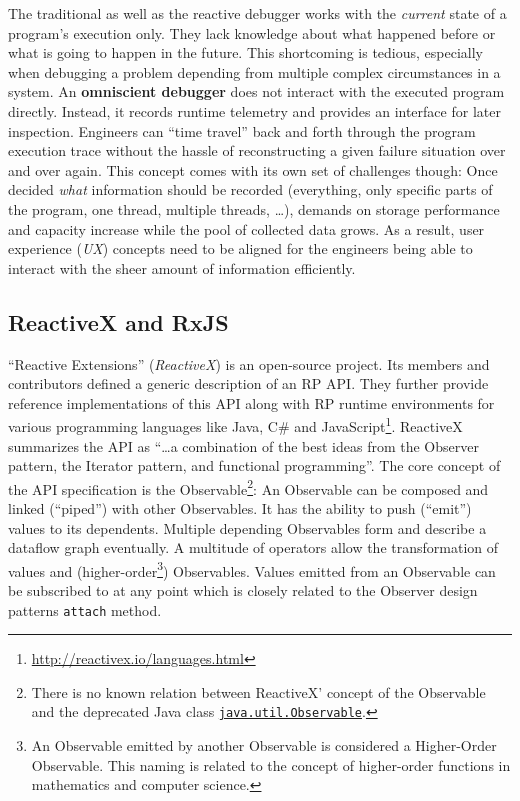 \documentclass[12pt,a4paper]{article}
\begin{document}
The traditional as well as the reactive debugger works with the \emph{current} state of a program's execution only. They lack knowledge about what happened before or what is going to happen in the future. This shortcoming is tedious, especially when debugging a problem depending from multiple complex circumstances in a system. An \textbf{omniscient debugger} \cite{5287015} \cite{DBLP:journals/corr/OCallahanJFHNP17} does not interact with the executed program directly. Instead, it records runtime telemetry and provides an interface for later inspection. Engineers can ``time travel'' back and forth through the program execution trace without the hassle of reconstructing a given failure situation over and over again. This concept comes with its own set of challenges though: Once decided \emph{what} information should be recorded (everything, only specific parts of the program, one thread, multiple threads, \dots), demands on storage performance and capacity increase while the pool of collected data grows. As a result, user experience (\emph{UX}) concepts need to be aligned for the engineers being able to interact with the sheer amount\cite{5287015} of information efficiently.

\subsection{ReactiveX and RxJS}

``Reactive Extensions'' (\emph{ReactiveX}) is an open-source project. Its members and contributors defined a generic description of an RP API. They further provide reference implementations of this API along with RP runtime environments for various programming languages like Java, C\# and JavaScript\footnote{\url{http://reactivex.io/languages.html}}. ReactiveX summarizes the API as ``\dots a combination of the best ideas from the Observer pattern, the Iterator pattern, and functional programming''\cite{reactivex}. The core concept of the API specification is the Observable\footnote{There is no known relation between ReactiveX' concept of the Observable and the deprecated Java class \href{https://docs.oracle.com/en/java/javase/11/docs/api/java.base/java/util/Observable.html}{\texttt{java.util.Observable}}.}: An Observable can be composed and linked (``piped'') with other Observables. It has the ability to push (``emit'') values to its dependents. Multiple depending Observables form and describe a dataflow graph eventually. A multitude of operators allow the transformation of values and (higher-order\footnote{An Observable emitted by another Observable is considered a Higher-Order Observable. This naming is related to the concept of higher-order functions in mathematics and computer science.}) Observables. Values emitted from an Observable can be subscribed to at any point which is closely related to the Observer design patterns \texttt{attach} method.
\end{document}
